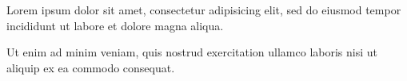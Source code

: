 \begin{minipage}{0.45\textwidth}
    Lorem ipsum dolor sit amet, consectetur adipisicing elit, sed do eiusmod
    tempor incididunt ut labore et dolore magna aliqua. 

    Ut enim ad minim veniam,
    quis nostrud exercitation ullamco laboris nisi ut aliquip ex ea commodo
    consequat.
\end{minipage}
\hfill
\begin{minipage}{0.45\textwidth}
    \begin{center}
    \end{center}
\end{minipage}

